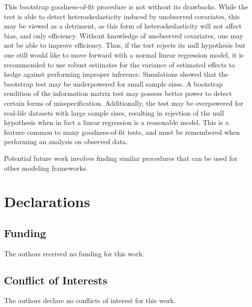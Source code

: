 \documentclass[sn-mathphys-ay]{sn-jnl}
\begin{document}
This bootstrap goodness-of-fit procedure is not without its drawbacks. While the test is able to detect heteroskedasticity induced by unobserved covariates, this may be viewed as a detriment,
as this form of heteroskedasticity will not affect bias, and only efficiency. Without knowledge of unobserved covariates, one may not be able to improve efficiency. Thus, if the test rejects its
null hypothesis but one still would like  to move forward with a normal linear regression model, it is recommended to use robust estimates for the variance of estimated effects
to hedge against performing improper inference. Simulations showed that the bootstrap test may be underpowered for small sample sizes. A bootstrap rendition of the information matrix test may
possess better power to detect certain forms of misspecification. Additionally, the test may be overpowered for real-life datasets with large sample sizes, resulting in rejection of the null hypothesis
when in fact a linear regression is a reasonable model. This is a feature common to many goodness-of-fit tests, and must be remembered when performing an analysis on observed data.

Potential future work involves finding similar procedures that can be used for other modeling frameworks.

\section*{Declarations}

\subsection*{Funding}

The authors received no funding for this work.

\subsection*{Conflict of Interests}

The authors declare no conflicts of interest for this work.


\end{document}
